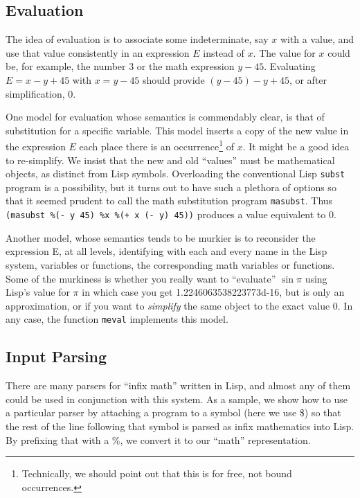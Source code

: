 \documentclass{article}
\begin{document}
{\subsection{Evaluation}

The idea of evaluation is to associate some indeterminate,
say $x$  with a value, and use that value consistently
in an expression $E$ instead of $x$.
The value for $x$ could be, for example, the number 3 or the
math expression $y-45$.  Evaluating $E= x-y+45$ with $x=y-45$ should provide
$(y-45)-y+45$, or after simplification, $0$. 

One model for evaluation whose semantics is commendably clear, is that
of substitution for a specific variable.  This model inserts a copy of
the new value in the expression $E$ each place there is an
occurrence\footnote {Technically, we should point out that
this is for free, not
bound occurrences.} of $x$.  It might be a good idea to
re-simplify. We insist that the new and old ``values'' must be
mathematical objects, as distinct from Lisp symbols.  Overloading the
conventional Lisp {\tt subst} program is a possibility, but it turns
out to have such a plethora of options so that it seemed prudent
to call the math
substitution program {\tt masubst}.  Thus {\tt (masubst \%(- y 45) \%x
\%(+ x (- y) 45))} produces a value equivalent to $0$.

Another model, whose semantics tends to be murkier is to reconsider the
expression E, at all levels, identifying with each and every name in the
Lisp system,  variables or functions, the corresponding math variables
or functions.  Some of the murkiness is whether you really want to ``evaluate''
$\sin \pi$ using Lisp's value for $\pi$ in which case you get
1.2246063538223773d-16, but is only an approximation, or if you want
to {\em simplify} the same object to the exact value 0. In any case,
the function {\tt meval} implements this model.

\subsection{Input Parsing}
There are many parsers for ``infix math'' written in Lisp, and
almost any of them could be used in conjunction with this
system.  As a sample, we show how to use a particular parser by
attaching a program to
a symbol (here we use \$) so that the rest of the line following
that symbol is parsed as infix mathematics into Lisp. By prefixing that
with a \%, we convert it to our ``math'' representation.

}
\end{document}
